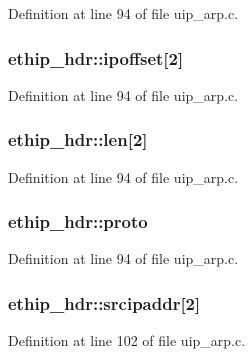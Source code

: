 Definition at line 94 of file uip\_\-arp.c.

\hypertarget{structethip__hdr_a533fe5b5de891fd06dd8a270869b9d1e}{
\subsubsection[{ipoffset}]{ {\bf ethip\_\-hdr::ipoffset}\mbox{[}2\mbox{]}}}
\label{structethip__hdr_a533fe5b5de891fd06dd8a270869b9d1e}


Definition at line 94 of file uip\_\-arp.c.

\hypertarget{structethip__hdr_adf04415fa4f1d2c7c038aa131cdc640e}{
\subsubsection[{len}]{ {\bf ethip\_\-hdr::len}\mbox{[}2\mbox{]}}}
\label{structethip__hdr_adf04415fa4f1d2c7c038aa131cdc640e}


Definition at line 94 of file uip\_\-arp.c.

\hypertarget{structethip__hdr_aeac57681623f14a72fcadfc62a2bb37f}{
\subsubsection[{proto}]{ {\bf ethip\_\-hdr::proto}}}
\label{structethip__hdr_aeac57681623f14a72fcadfc62a2bb37f}


Definition at line 94 of file uip\_\-arp.c.

\hypertarget{structethip__hdr_a74e65215e26a9597a57a7be6a633f63a}{
\subsubsection[{srcipaddr}]{ {\bf ethip\_\-hdr::srcipaddr}\mbox{[}2\mbox{]}}}
\label{structethip__hdr_a74e65215e26a9597a57a7be6a633f63a}


Definition at line 102 of file uip\_\-arp.c.

